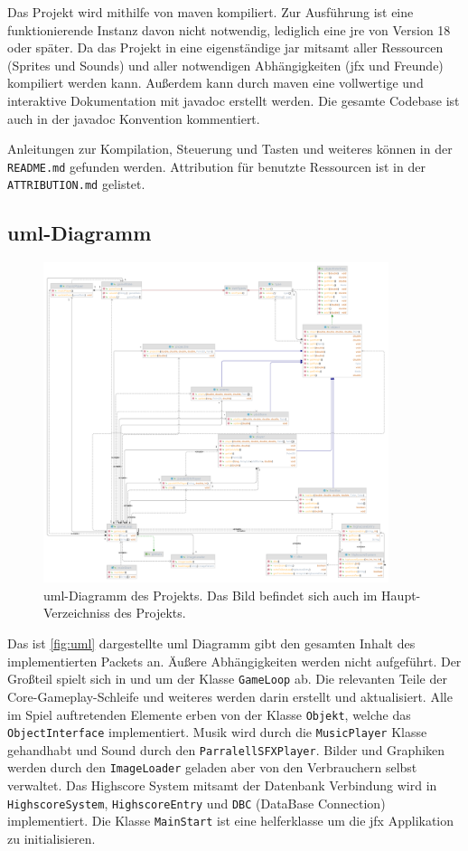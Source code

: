 Das Projekt wird mithilfe von \gls{maven} kompiliert.
Zur Ausführung ist eine funktionierende Instanz davon nicht notwendig, lediglich eine \gls{jre} von Version 18 oder später.
Da das Projekt in eine eigenständige \gls{jar} mitsamt aller Ressourcen (Sprites und Sounds) und aller notwendigen Abhängigkeiten (\gls{jfx} und Freunde) kompiliert werden kann.
Außerdem kann durch \gls{maven} eine vollwertige und interaktive Dokumentation mit \gls{javadoc} erstellt werden.
Die gesamte Codebase ist auch in der \gls{javadoc} Konvention kommentiert.

Anleitungen zur Kompilation, Steuerung und Tasten und weiteres können in der \texttt{README.md} gefunden werden.
Attribution für benutzte Ressourcen ist in der \texttt{ATTRIBUTION.md} gelistet.

\subsection{\acrshort{uml}-Diagramm}

\begin{figure}[H]
    \centering
    \includegraphics[width=0.9\textwidth]{img/uml.png}
    \caption{\gls{uml}-Diagramm des Projekts. Das Bild befindet sich auch im Haupt-Verzeichniss des Projekts.}
    \label{fig:uml}
\end{figure}

Das ist \autoref{fig:uml} dargestellte \gls{uml} Diagramm gibt den gesamten Inhalt des implementierten Packets an.
Äußere Abhängigkeiten werden nicht aufgeführt.
Der Großteil spielt sich in und um der Klasse \texttt{GameLoop} ab.
Die relevanten Teile der Core-Gameplay-Schleife und weiteres werden darin erstellt und aktualisiert.
Alle im Spiel auftretenden Elemente erben von der Klasse \texttt{Objekt}, welche das \texttt{ObjectInterface} implementiert.
Musik wird durch die \texttt{MusicPlayer} Klasse gehandhabt und Sound durch den \texttt{ParralellSFXPlayer}.
Bilder und Graphiken werden durch den \texttt{ImageLoader} geladen aber von den Verbrauchern selbst verwaltet.
Das Highscore System mitsamt der Datenbank Verbindung wird in \texttt{HighscoreSystem}, \texttt{HighscoreEntry} und \texttt{DBC} (DataBase Connection) implementiert.
Die Klasse \texttt{MainStart} ist eine helferklasse um die \gls{jfx} Applikation zu initialisieren.

